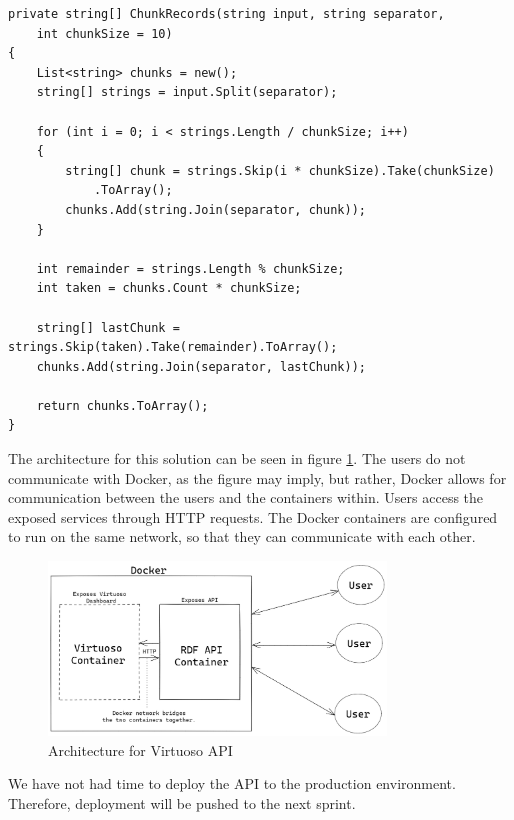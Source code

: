 \begin{lstlisting}[language=CSharp, caption={Chunking logic for large queries}, label={lst:virtuoso_chunking}]
private string[] ChunkRecords(string input, string separator, 
    int chunkSize = 10)
{
    List<string> chunks = new();
    string[] strings = input.Split(separator);
    
    for (int i = 0; i < strings.Length / chunkSize; i++)
    {
        string[] chunk = strings.Skip(i * chunkSize).Take(chunkSize)
            .ToArray();
        chunks.Add(string.Join(separator, chunk));
    }

    int remainder = strings.Length % chunkSize;
    int taken = chunks.Count * chunkSize;

    string[] lastChunk = strings.Skip(taken).Take(remainder).ToArray();
    chunks.Add(string.Join(separator, lastChunk));
    
    return chunks.ToArray();
}
\end{lstlisting}


The architecture for this solution can be seen in figure \ref{fig:virtuoso_architecture}. The users do not communicate with Docker, as the figure may imply, but rather, Docker allows for communication between the users and the containers within. Users access the exposed services through HTTP requests. The Docker containers are configured to run on the same network, so that they can communicate with each other.

\begin{figure}[h!]
\centering
\includegraphics[width=0.8\textwidth]{Images/Virtuoso_Architecture.png}
\caption{Architecture for Virtuoso API}
\label{fig:virtuoso_architecture}
\end{figure}

We have not had time to deploy the API to the production environment. Therefore, deployment will be pushed to the next sprint.